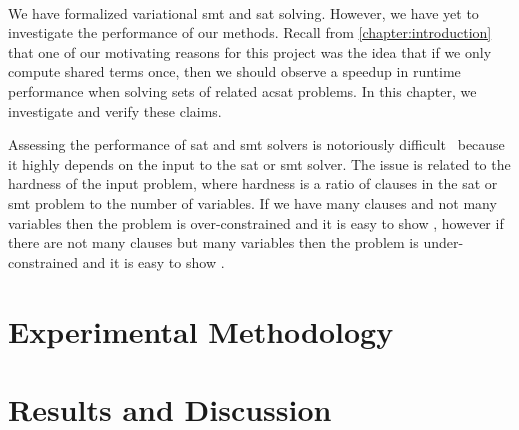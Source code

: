 ~\label{chapter:case-studies}

We have formalized variational \ac{smt} and \ac{sat} solving. However, we have
yet to investigate the performance of our methods. Recall from
\autoref{chapter:introduction} that one of our motivating reasons for this
project was the idea that if we only compute shared terms once, then we should
observe a speedup in runtime performance when solving sets of related ac{sat}
problems. In this chapter, we investigate and verify these claims.

Assessing the performance of \ac{sat} and \ac{smt} solvers is notoriously
difficult~\cite{Gent94thesat} because it highly depends on the input to the
\ac{sat} or \ac{smt} solver. The issue is related to the hardness of the input
problem, where hardness is a ratio of clauses in the \ac{sat} or \ac{smt}
problem to the number of variables. If we have many clauses and not many
variables then the problem is over-constrained and it is easy to show
, however if there are not many clauses but many variables then the
problem is under-constrained and it is easy to show .


\section{Experimental Methodology}


\section{Results and Discussion}



